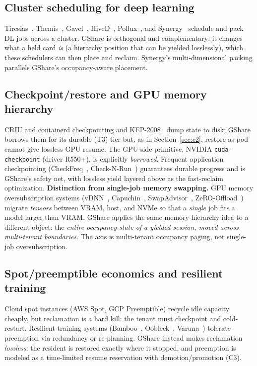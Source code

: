 \documentclass[preprint,12pt]{elsarticle}
\begin{document}
\subsection{Cluster scheduling for deep learning}
Tiresias~\cite{tiresias}, Themis~\cite{themis}, Gavel~\cite{gavel}, HiveD~\cite{hived},
Pollux~\cite{pollux}, and Synergy~\cite{synergy} schedule and pack DL jobs across a cluster. GShare is
orthogonal and complementary: it changes what a held card \emph{is} (a hierarchy position that can be
yielded losslessly), which these schedulers can then place and reclaim. Synergy's multi-dimensional
packing parallels GShare's occupancy-aware placement.

\subsection{Checkpoint/restore and GPU memory hierarchy}
CRIU and containerd checkpointing and KEP-2008~\cite{kep2008} dump state to disk; GShare borrows them for
its durable (T3) tier but, as in Section~\ref{sec:c2}, restore-as-pod cannot give lossless GPU resume. The
GPU-side primitive, NVIDIA \texttt{cuda-checkpoint} (driver R550+), is explicitly \emph{borrowed}.
Frequent application checkpointing (CheckFreq~\cite{checkfreq}, Check-N-Run~\cite{checknrun}) guarantees
durable progress and is GShare's safety net, with lossless yield layered above as the fast-reclaim
optimization. \textbf{Distinction from single-job memory swapping.} GPU memory oversubscription systems
(vDNN~\cite{vdnn}, Capuchin~\cite{capuchin}, SwapAdvisor~\cite{swapadvisor}, ZeRO-Offload~\cite{zero})
migrate \emph{tensors} between VRAM, host, and NVMe so that a \emph{single} job fits a model larger than
VRAM. GShare applies the same memory-hierarchy idea to a different object: the \emph{entire occupancy state
of a yielded session, moved across multi-tenant boundaries}. The axis is multi-tenant occupancy paging, not
single-job oversubscription.

\subsection{Spot/preemptible economics and resilient training}
Cloud spot instances (AWS Spot, GCP Preemptible) recycle idle capacity cheaply, but reclamation is a hard
kill: the tenant must checkpoint and cold-restart. Resilient-training systems
(Bamboo~\cite{bamboo}, Oobleck~\cite{oobleck}, Varuna~\cite{varuna}) tolerate preemption via redundancy or
re-planning. GShare instead makes reclamation \emph{lossless}: the resident is restored exactly where it
stopped, and preemption is modeled as a time-limited resume reservation with demotion/promotion (C3).
\end{document}
